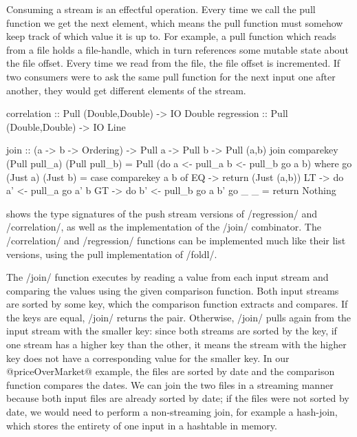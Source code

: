 Consuming a stream is an effectful operation.
Every time we call the pull function we get the next element, which means the pull function must somehow keep track of which value it is up to.
For example, a pull function which reads from a file holds a file-handle, which in turn references some mutable state about the file offset.
Every time we read from the file, the file offset is incremented.
If two consumers were to ask the same pull function for the next input one after another, they would get different elements of the stream.


\begin{haskell}[float,caption=Pull stream combinators,label=figs/impl/pull/combinator]
correlation :: Pull (Double,Double) -> IO Double
regression  :: Pull (Double,Double) -> IO Line

join        :: (a -> b -> Ordering) -> Pull a -> Pull b -> Pull (a,b)
join comparekey (Pull pull_a) (Pull pull_b) = Pull (do
   a <- pull_a
   b <- pull_b
   go a b)
 where
  go (Just a) (Just b)
   = case comparekey a b of
      EQ -> return (Just (a,b))
      LT -> do
        a' <- pull_a
        go a' b
      GT -> do
        b' <- pull_b
        go a b'
  go _ _ = return Nothing
\end{haskell}


 shows the type signatures of the push stream versions of \Hs/regression/ and \Hs/correlation/, as well as the implementation of the \Hs/join/ combinator.
The \Hs/correlation/ and \Hs/regression/ functions can be implemented much like their list versions, using the pull implementation of \Hs/foldl/.

The \Hs/join/ function executes by reading a value from each input stream and comparing the values using the given comparison function.
Both input streams are sorted by some key, which the comparison function extracts and compares.
If the keys are equal, \Hs/join/ returns the pair.
Otherwise, \Hs/join/ pulls again from the input stream with the smaller key: since both streams are sorted by the key, if one stream has a higher key than the other, it means the stream with the higher key does not have a corresponding value for the smaller key.
In our @priceOverMarket@ example, the files are sorted by date and the comparison function compares the dates.
We can join the two files in a streaming manner because both input files are already sorted by date; if the files were not sorted by date, we would need to perform a non-streaming join, for example a hash-join, which stores the entirety of one input in a hashtable in memory.


